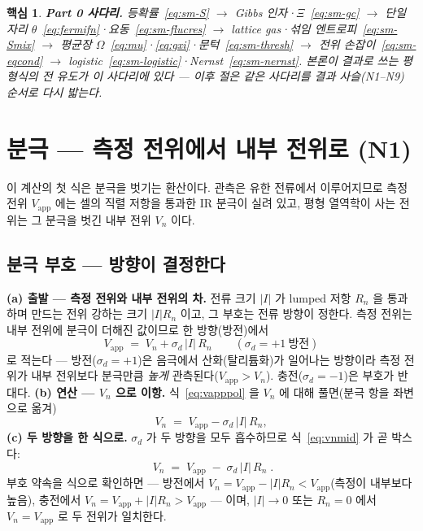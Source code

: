 \documentclass[11pt,a4paper]{article}
\newtheorem*{keybox}{핵심}
\newcommand{\app}{\mathrm{app}}
\begin{document}
\begin{keybox}
\textbf{Part 0 사다리.} 등확률~\eqref{eq:sm-S} $\to$ Gibbs 인자·$\Xi$~\eqref{eq:sm-gc} $\to$ 단일 자리
$\theta$~\eqref{eq:fermifn}·요동~\eqref{eq:sm-flucres} $\to$ lattice gas·섞임 엔트로피~\eqref{eq:sm-Smix}
$\to$ 평균장 $\Omega$~\eqref{eq:mu}·\eqref{eq:gxi}·문턱~\eqref{eq:sm-thresh} $\to$ 전위
손잡이~\eqref{eq:sm-eqcond} $\to$ logistic~\eqref{eq:sm-logistic}·Nernst~\eqref{eq:sm-nernst}. 본론이 결과로
쓰는 평형식의 전 유도가 이 사다리에 있다 --- 이후 절은 같은 사다리를 결과 사슬(N1--N9) 순서로
다시 밟는다.
\end{keybox}

\section{분극 — 측정 전위에서 내부 전위로 (N1)}\label{sec:pol}
이 계산의 첫 식은 분극을 벗기는 환산이다. 관측은 유한 전류에서 이루어지므로 측정 전위 $V_\app$ 에는 셀의
직렬 저항을 통과한 IR 분극이 실려 있고, 평형 열역학이 사는 전위는 그 분극을 벗긴 내부 전위 $V_n$ 이다.

\subsection{분극 부호 — 방향이 결정한다}
\textbf{(a) 출발 — 측정 전위와 내부 전위의 차.} 전류 크기 $|I|$ 가 lumped 저항 $R_n$ 을 통과하며 만드는 전위 강하는
크기 $|I|R_n$ 이고, 그 부호는 전류 방향이 정한다. 측정 전위는 내부 전위에 분극이 더해진 값이므로 한 방향(방전)에서
\begin{equation}
V_\app\;=\;V_n+\sigma_d\,|I|\,R_n
\qquad(\sigma_d=+1\ \text{방전})
\label{eq:vapppol}
\end{equation}
로 적는다 — 방전($\sigma_d=+1$)은 음극에서 산화(탈리튬화)가 일어나는 방향이라 측정 전위가 내부 전위보다 분극만큼
\emph{높게} 관측된다($V_\app>V_n$). 충전($\sigma_d=-1$)은 부호가 반대다. \textbf{(b) 연산 — $V_n$ 으로 이항.}
식~\eqref{eq:vapppol} 을 $V_n$ 에 대해 풀면(분극 항을 좌변으로 옮겨)
\begin{equation}
V_n\;=\;V_\app-\sigma_d\,|I|\,R_n,
\label{eq:vnmid}
\end{equation}
\textbf{(c) 두 방향을 한 식으로.} $\sigma_d$ 가 두 방향을 모두 흡수하므로 식~\eqref{eq:vnmid} 가 곧 박스다:
\begin{equation}
\boxed{\;V_n\;=\;V_\app\;-\;\sigma_d\,|I|\,R_n\;.}
\label{eq:vn}
\end{equation}
부호 약속을 식으로 확인하면 —
방전에서 $V_n=V_\app-|I|R_n<V_\app$(측정이 내부보다 높음), 충전에서 $V_n=V_\app+|I|R_n>V_\app$ — 이며,
$|I|\to0$ 또는 $R_n=0$ 에서 $V_n=V_\app$ 로 두 전위가 일치한다.
\end{document}
